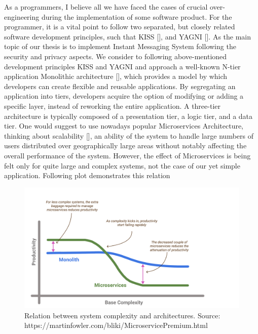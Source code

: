As a programmers, I believe all we have faced the cases of crucial over-engineering during the implementation of some
software product.
For the programmer, it is a vital point to follow two separated, but closely related software development principles,
such that KISS [\cite{alwin2016kiss}], and YAGNI [\cite{da2018evolution}].
As the main topic of our thesis is to implement Instant Messaging System following the security and privacy aspects.
We consider to following above-mentioned development principles KISS and YAGNI and approach
a well-known N-tier application Monolithic architecture [\cite{bucchiarone2018monolithic}], which provides a model by which developers can
create flexible and reusable applications.
By segregating an application into tiers, developers acquire the option of modifying or adding a specific layer,
instead of reworking the entire application.
A three-tier architecture is typically composed of a presentation tier, a logic tier, and a data tier.
One would suggest to use nowadays popular Microservices Architecture, thinking about scalability [\cite{brataas2004exploring}],
an ability of the system to handle large numbers of users distributed over geographically large areas without
notably affecting the overall performance of the system.
However, the effect of Microservices is being felt only for quite large and complex systems,
not the case of our yet simple application.
Following plot demonstrates this relation

\begin{figure}[H]
    \centering
    \includegraphics[width=1\textwidth]{Pictures/Monolith_vs_Microservice.pdf}
    \caption{Relation between system complexity and architectures. Source: https://martinfowler.com/bliki/MicroservicePremium.html}
    \label{fig:monolith_vs_microservice}
\end{figure}

